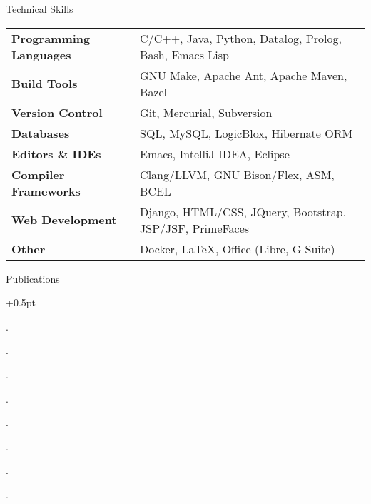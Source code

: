 \documentclass{resume}
\begin{document}
\begin{rSection}{Technical Skills}

{\renewcommand{\arraystretch}{1.3}
\begin{tabular}{ @{} >{\bfseries}l @{\hspace{6ex}} l }

Programming Languages
   & C/C++, Java, Python, Datalog, Prolog, Bash, Emacs Lisp \\

Build Tools
   & GNU Make, Apache Ant, Apache Maven, Bazel \\

Version Control
   & Git, Mercurial, Subversion \\

Databases
   & SQL, MySQL, LogicBlox, Hibernate ORM \\


Editors \& IDEs
   & Emacs, IntelliJ IDEA, Eclipse \\

Compiler Frameworks
   & Clang/LLVM, GNU Bison/Flex, ASM, BCEL \\


Web Development
   & Django, HTML/CSS, JQuery, Bootstrap, JSP/JSF, PrimeFaces \\

Other
   & Docker, \LaTeX{}, Office (Libre, G Suite) \\
\end{tabular}}
\end{rSection}


\begin{rSection}{Publications}
  \begin{rSubsection}{}{}{}{}
    \itemsep +0.5pt %
  \item {}.
  \item {}.
  \item {}.
  \item {}.
  \item {}.
  \item {}.
  \item {}.
  \item {}.
  \end{rSubsection}
\end{rSection}
\end{document}
